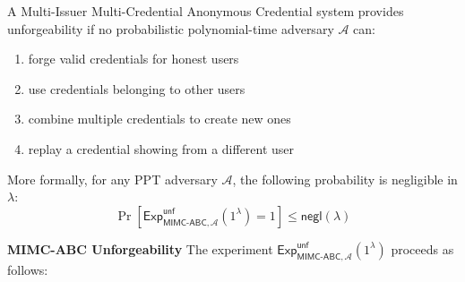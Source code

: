 \newpage
\begin{definition}
A Multi-Issuer Multi-Credential Anonymous Credential system provides unforgeability if no probabilistic polynomial-time adversary $\mathcal{A}$ can:
\begin{enumerate}
    \item forge valid credentials for honest users
    \item use credentials belonging to other users
    \item combine multiple credentials to create new ones
    \item replay a credential showing from a different user
\end{enumerate}

\noindent More formally, for any PPT adversary $\mathcal{A}$, the following probability is negligible in $\lambda$:
\[ \Pr[\mathsf{Exp}^{\mathsf{unf}}_{\mathsf{MIMC\mbox{-}ABC},\mathcal{A}}(1^\lambda) = 1] \leq \mathsf{negl}(\lambda) \]
\end{definition}

\noindent \textbf{MIMC-ABC Unforgeability} 
The experiment $\mathsf{Exp}^{\mathsf{unf}}_{\mathsf{MIMC\mbox{-}ABC},\mathcal{A}}(1^\lambda)$ proceeds as follows:

